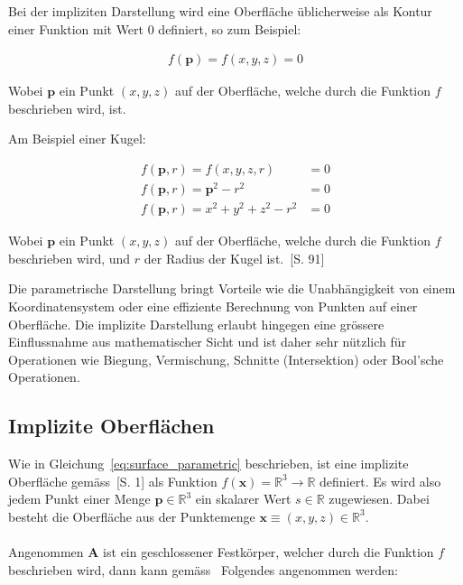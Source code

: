 Bei der impliziten Darstellung wird eine Oberfläche üblicherweise als Kontur
einer Funktion mit Wert 0 definiert, so zum Beispiel:

\begin{gather}\label{eq:surface_implicit}
    f(\bm{p}) = f(x, y, z) = 0
\end{gather}

Wobei $\bm{p}$ ein Punkt $(x, y, z)$ auf der Oberfläche, welche durch die Funktion
$f$ beschrieben wird, ist.

Am Beispiel einer Kugel:

\begin{align}\label{eq:sphere_implicit}
    f(\bm{p}, r) = f(x, y, z, r) &= 0 \\
    f(\bm{p}, r) = \bm{p}^{2} - r^{2} &= 0 \\
    f(\bm{p}, r) = x^{2} + y^{2} + z^{2} - r^{2} &= 0
\end{align}

Wobei $\bm{p}$ ein Punkt $(x, y, z)$ auf der Oberfläche, welche durch die Funktion
$f$ beschrieben wird, und $r$ der Radius der Kugel ist.~\cite{glassner_introduction_1989}[S. 91]

Die parametrische Darstellung bringt Vorteile wie die Unabhängigkeit von einem
Koordinatensystem oder eine effiziente Berechnung von Punkten auf einer
Oberfläche. Die implizite Darstellung erlaubt hingegen eine grössere
Einflussnahme aus mathematischer Sicht und ist daher sehr nützlich für
Operationen wie Biegung, Vermischung, Schnitte (Intersektion) oder Bool'sche
Operationen.

\subsection{Implizite Oberflächen}
\label{subsec:implicit_surfaces}

Wie in Gleichung~\ref{eq:surface_parametric} beschrieben, ist eine implizite
Oberfläche gemäss~\cite{hart_ray_1993}[S. 1] als Funktion $ f(\bm{x}) =
\mathbb{R}^{3} \to \mathbb{R} $ definiert.  Es wird also jedem Punkt einer
Menge $ \bm{p} \in \mathbb{R}^{3} $ ein skalarer Wert $ s \in \mathbb{R} $
zugewiesen. Dabei besteht die Oberfläche aus der Punktemenge $ \bm{x} \equiv
(x, y, z) \in \mathbb{R}^{3} $.\\
\\
Angenommen $ \bm{A} $ ist ein geschlossener Festkörper, welcher durch die
Funktion $f$ beschrieben wird, dann kann gemäss~\cite{hart_ray_1993} Folgendes
angenommen werden:

